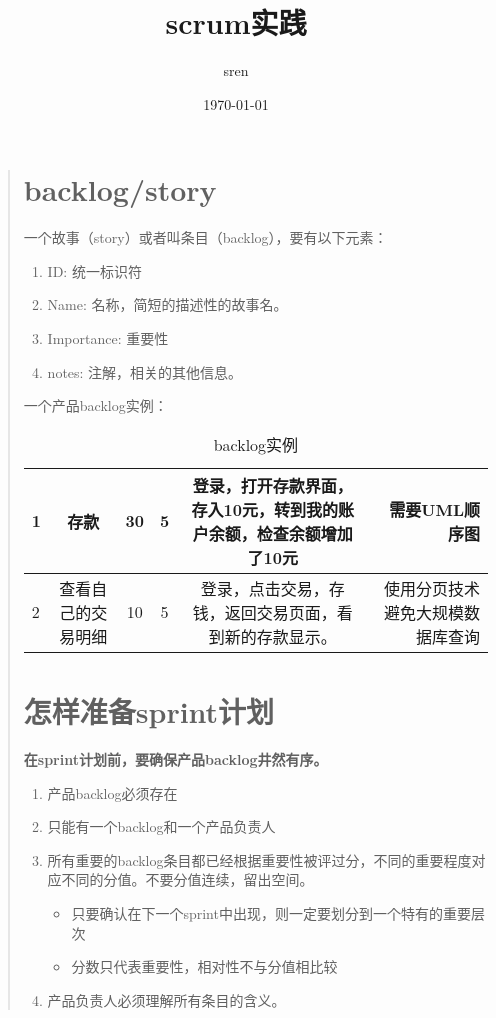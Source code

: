 \documentclass[a4paper,12pt]{article}
\title{scrum实践}
\author{sren}
\date{\today}
\begin{document}
\maketitle

\newpage

\tableofcontents

\newpage

\begin{quote}
 \section{backlog/story}

 一个故事（story）或者叫条目（backlog），要有以下元素：
 
 \begin{enumerate}
  \item ID: 统一标识符
  \item Name: 名称，简短的描述性的故事名。
  \item Importance: 重要性
  \item notes: 注解，相关的其他信息。
 \end{enumerate}

一个产品backlog实例：
\begin{table}
\begin{tabular}{|l|c|c|c|c|r|}
\hline
1	&存款	&30	&5	&登录，打开存款界面，存入10元，转到我的账户余额，检查余额增加了10元	&需要UML顺序图	\\
\hline
2	&查看自己的交易明细 &10 &5 &登录，点击交易，存钱，返回交易页面，看到新的存款显示。 &使用分页技术避免大规模数据库查询 \\
\hline
\end{tabular}
\caption{backlog实例}
\label{图表1}
\end{table}


\section{怎样准备sprint计划}
\textbf{在sprint计划前，要确保产品backlog井然有序。}

\begin{enumerate}
  \item 产品backlog必须存在
  \item 只能有一个backlog和一个产品负责人
  \item 所有重要的backlog条目都已经根据重要性被评过分，不同的重要程度对应不同的分值。不要分值连续，留出空间。
    \begin{itemize}
     \item 只要确认在下一个sprint中出现，则一定要划分到一个特有的重要层次
     \item 分数只代表重要性，相对性不与分值相比较
    \end{itemize}
  \item 产品负责人必须理解所有条目的含义。
 \end{enumerate}


\end{quote}
\end{document}
